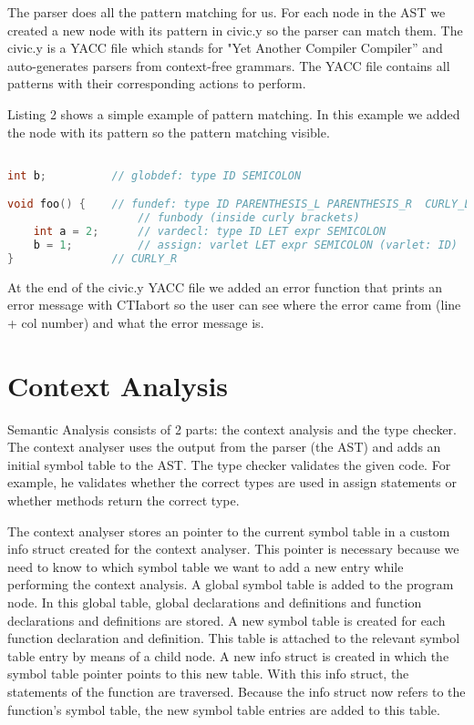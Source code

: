 \documentclass{uva-inf-article}
\begin{document}
The parser does all the pattern matching for us. For each node in the AST we created 
a new node with its pattern in civic.y so the parser can match them. The civic.y is a
YACC file which stands for "Yet Another Compiler Compiler” and auto-generates parsers
from context-free grammars. The YACC file contains all patterns with their corresponding
actions to perform.

Listing 2 shows a simple example of pattern matching. In this example we added the
node with its pattern so the pattern matching visible. 

\begin{lstlisting}[basicstyle=\small, language=C, label=lst:code-2, caption=Pattern matching Example, captionpos=b]

int b;          // globdef: type ID SEMICOLON

void foo() {    // fundef: type ID PARENTHESIS_L PARENTHESIS_R  CURLY_L
                    // funbody (inside curly brackets)
    int a = 2;      // vardecl: type ID LET expr SEMICOLON
    b = 1;          // assign: varlet LET expr SEMICOLON (varlet: ID)
}               // CURLY_R 
\end{lstlisting}

At the end of the civic.y YACC file we added an error function that prints an error message
with CTIabort so the user can see where the error came from (line + col number) and what
the error message is. 

\section{Context Analysis}
Semantic Analysis consists of 2 parts: the context analysis and the type checker. The context
analyser uses the output from the parser (the AST) and adds an initial symbol table to the AST.
The type checker validates the given code. For example, he validates whether the correct 
types are used in assign statements or whether methods return the correct type.

The context analyser stores an pointer to the current symbol table in a custom info struct created for the context analyser.
This pointer is necessary because we need to know to which symbol table we want to add a new entry while performing the context analysis.
A global symbol table is added to the program node.
In this global table, global declarations and definitions and function declarations and definitions are stored.
A new symbol table is created for each function declaration and definition. 
This table is attached to the relevant symbol table entry by means of a child node.
A new info struct is created in which the symbol table pointer points to this new table. 
With this info struct, the statements of the function are traversed. 
Because the info struct now refers to the function's symbol table, the new symbol table entries are added to this table.
\end{document}
